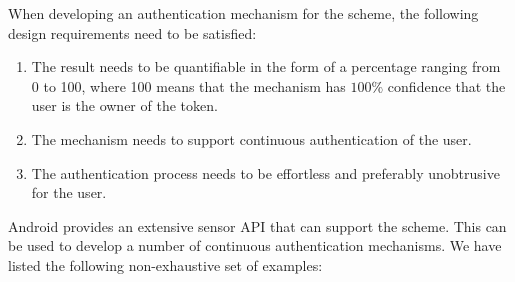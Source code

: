 When developing an authentication mechanism for the scheme, the following design requirements need to be satisfied: 
\begin{enumerate}
	\item The result needs to be quantifiable in the form of a percentage ranging from 0 to 100, where 100 means that the mechanism has $100\%$ confidence that the user is the owner of the token.
	\item The mechanism needs to support continuous authentication of the user.
	\item The authentication process needs to be effortless and preferably unobtrusive for the user.
\end{enumerate}

Android provides an extensive sensor API that can support the scheme. This can be used to develop a number of continuous authentication mechanisms.  We have listed the following non-exhaustive set of examples:
